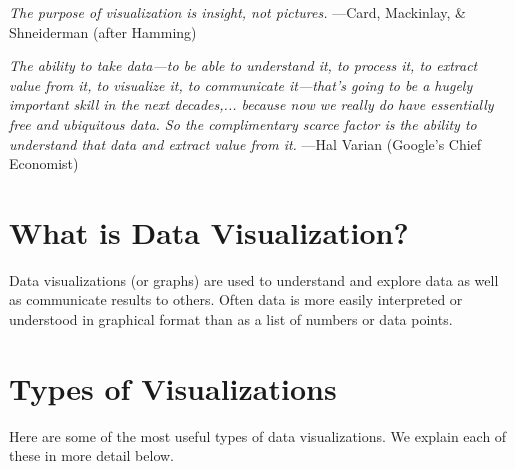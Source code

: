 \label{lab:DataVis}

\noindent\emph{The purpose of visualization is insight, not pictures.} \small{---Card, Mackinlay, \& Shneiderman (after Hamming)}

\medskip

\noindent\emph{The ability to take data---to be able to understand it, to process it,
to extract value from it, to visualize it, to communicate it---that's
going to be a hugely important skill in the next decades,... because
now we really do have essentially free and ubiquitous data. So the
complimentary scarce factor is the ability to understand that data and
extract value from it.} \small{---Hal Varian (Google's Chief Economist)}



\section*{What is Data Visualization?} 
Data visualizations (or graphs) are used to understand and explore data as well as communicate results to others.  Often data is more easily interpreted or understood in graphical format than as a list of numbers or data points.  




\section*{Types of Visualizations}

Here are some of the most useful types of data visualizations.  We explain each of these in more detail below.

